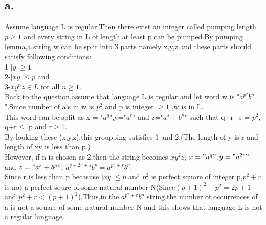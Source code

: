 \documentclass[12pt]{article}
\begin{document}
\subsection*{a.}

Assume language L is regular.Then there exist an integer called pumping length $p \geq 1$ and every string in L of length at least p can be pumped.By pumping lemma,a string w can be split into 3 parts namely x,y,z and these parts should satisfy following conditions:\\
1-$|y|\geq 1$ \\
2-$|xy|\leq p$ and \\
3-$xy^nz \in L$ for all $n \geq 1$. \\  

Back to the question,assume that language L is regular and let word w is "$a^{p^2}b^p$".Since number of a's in w is $p^2$ and p is integer $\geq 1$ ,w is in L.\\

This word can be split as x = "$a^q$",y="$a^r$" and z="$a^s+b^p$" such that q+r+s = $p^2$, q+r$\leq$ p and r$\geq$1.\\
By looking these (x,y,z),this groupping satisfies 1 and 2.(The length of y is r and length of xy is less than p.)\\
However, if n is chosen as 2,then the string becomes $xy^2z$, $x = "a^q",y="a^{2r}"$ and $z="a^s+b^p"$, $a^{q+2r+s}b^p = a^{p^2+r}b^p$.\\

Since r is less than p becasuse $|xy|\leq p$ and $p^2$ is perfect square of  integer p,$p^2+r$ is not a perfect squre of some natural number N(Since$(p+1)^2-p^2 = 2p+1$ and $p^2+r < (p+1)^2$).Thus,in the $a^{p^2+r}b^p$ string,the number of occurrences of a is not a square of some natural number N and this shows that language L is not a regular language.  
\end{document}
